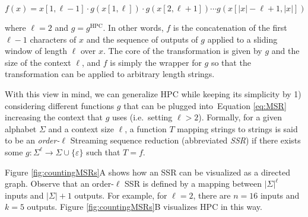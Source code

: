 \documentclass[
  11pt,
  twoside]{scrbook}
\begin{document}
\begin{equation}
  f(x) = x[1,\ell-1]\cdot g(x[1,\ell]) \cdot g(x[2, \ell+1])\cdots g(x[|x|-\ell+1,|x|]) 
  \label{eq:MSR}
\end{equation}

where \(\ell = 2\) and \(g=g^\text{HPC}\). In other words, \(f\) is the concatenation of the first \(\ell-1\) characters of \(x\) and the sequence of outputs of \(g\) applied to a sliding window of length \(\ell\) over \(x\). The core of the transformation is given by \(g\) and the size of the context \(\ell\), and \(f\) is simply the wrapper for \(g\) so that the transformation can be applied to arbitrary length strings.

With this view in mind, we can generalize HPC while keeping its simplicity by 1) considering different functions \(g\) that can be plugged into~Equation \eqref{eq:MSR} increasing the context that \(g\) uses (i.e.~setting \(\ell>2\)). Formally, for a given alphabet \(\Sigma\) and a context size \(\ell\), a function \(T\) mapping strings to strings is said to be an \emph{order-}\(\ell\) Streaming sequence reduction (abbreviated \emph{SSR}) if there exists some \(g : \Sigma^\ell\rightarrow\Sigma\cup\{\varepsilon\}\) such that \(T=f\).

Figure \ref{fig:countingMSRs}A shows how an SSR can be visualized as a directed graph. Observe that an order-\(\ell\) SSR is defined by a mapping between \(|\Sigma|^\ell\) inputs and \(|\Sigma| + 1\) outputs. For example, for \(\ell=2\), there are \(n=16\) inputs and \(k=5\) outputs. Figure \ref{fig:countingMSRs}B visualizes HPC in this way.
\end{document}
